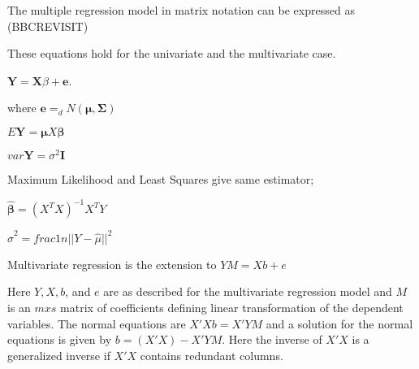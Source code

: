 The multiple regression model in matrix notation can be expressed
as
(BBCREVISIT)

These equations hold for the univariate and the multivariate case.

$\textbf{Y} = \textbf{X}{\beta} + \textbf{e}$.

where $\textbf{e} =_d N(\mathbf{\mu},\mathbf{\Sigma})$

$E \textbf{Y} = \mathbf{\mu} X \mathbf{\beta}$

$var \textbf{Y} = \sigma^2 \textbf{I}$

Maximum Likelihood and Least Squares give same estimator;

$\widehat{\mathbf{\beta}}=(X^TX)^{-1} X^T Y$

$\hat{\sigma}^2 = frac{1}{n} || Y- \hat{\mu} ||^2$

Multivariate regression is the extension to $YM = Xb + e$

Here $Y, X, b$, and $e$ are as described for the multivariate regression model and $M$ is an $m x s$ matrix of coefficients defining linear transformation of the dependent variables. The normal equations are $X'Xb = X'YM$ and a solution for the normal equations is given by $b = (X'X)-X'YM$. Here the inverse of $X'X$ is a generalized inverse if $X'X$ contains
redundant columns.


